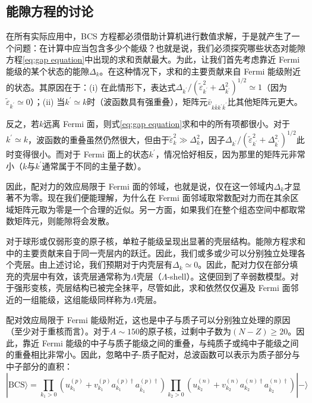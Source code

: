 \subsection{能隙方程的讨论\label{subsec:=0080FD=009699=0065B9=007A0B=007684=008BA8=008BBA}}

在所有实际应用中，BCS 方程都必须借助计算机进行数值求解，于是就产生了一个问题：在计算中应当包含多少个能级？也就是说，我们必须探究哪些状态对能隙方程\ref{eq:gap equation}中出现的求和贡献最大。为此，让我们首先考虑靠近
Fermi 能级的某个状态的能隙$\Delta_{k}$。在这种情况下，求和的主要贡献来自 Fermi 能级附近的状态。其原因在于：(i)
在此情形下，表达式$\Delta_{k^{\prime}}/(\tilde{\varepsilon}^{2}_{k^{\prime}}+\Delta^{2}_{k^{\prime}})^{1/2}\simeq1$（因为$\tilde{\varepsilon}_{k^{\prime}}\simeq0$）；(ii)
当$k^{\prime}\simeq k$时（波函数具有强重叠），矩阵元$\bar{v}_{k\bar{k}k^{\prime}\bar{k}^{\prime}}$比其他矩阵元更大。

反之，若$k$远离 Fermi 面，则式\ref{eq:gap equation}求和中的所有项都很小。对于$k^{\prime}\simeq k$，波函数的重叠虽然仍然很大，但由于$\tilde{\varepsilon}^{2}_{k}\gg\Delta^{2}_{k}$，因子$\Delta_{k^{\prime}}/(\tilde{\varepsilon}^{2}_{k^{\prime}}+\Delta^{2}_{k^{\prime}})^{1/2}$此时变得很小。而对于
Fermi 面上的状态$k^{\prime}$，情况恰好相反，因为那里的矩阵元非常小（$k$与$k^{\prime}$通常属于不同的主量子数）。

因此，配对力的效应局限于 Fermi 面的邻域，也就是说，仅在这一邻域内$\Delta_{k}$才显著不为零。现在我们便能理解，为什么在
Fermi 面邻域取常数配对力而在其余区域矩阵元取为零是一个合理的近似。另一方面，如果我们在整个组态空间中都取常数矩阵元，则能隙将会发散。

对于球形或仅弱形变的原子核，单粒子能级呈现出显著的壳层结构。能隙方程求和中的主要贡献来自于同一壳层内的跃迁。因此，我们或多或少可以分别独立处理各个壳层。由上述讨论，我们预期对于内壳层有$\Delta_{k}\simeq0$。因此，配对力仅在部分填充的壳层中有效，该壳层通常称为$\Lambda$壳层（$\Lambda$-shell）。这便回到了辛弱数模型。对于强形变核，壳层结构已被完全抹平，尽管如此，求和依然仅仅遍及
Fermi 面邻近的一组能级，这组能级同样称为$\Lambda$壳层。

配对效应局限于 Fermi 能级附近，这也是中子与质子可以分别独立处理的原因（至少对于重核而言）。对于$A\sim150$的原子核，过剩中子数为$(N-Z)\geqslant20$。因此，靠近
Fermi 能级的中子与质子能级之间的重叠，与纯质子或纯中子能级之间的重叠相比非常小。因此，忽略中子-质子配对，总波函数可以表示为质子部分与中子部分的直积：
\begin{equation}
|\text{BCS}\rangle=\prod_{k_{1}>0}\left(u^{(p)}_{k_{1}}+v^{(p)}_{k_{1}}a^{(p)\dagger}_{k_{1}}a^{(p)\dagger}_{\bar{k}_{1}}\right)\prod_{k_{2}>0}\left(u^{(n)}_{k_{2}}+v^{(n)}_{k_{2}}a^{(n)\dagger}_{k_{2}}a^{(n)\dagger}_{\bar{k}_{2}}\right)|-\rangle\label{eq:bcs_proton_neutron}
\end{equation}

